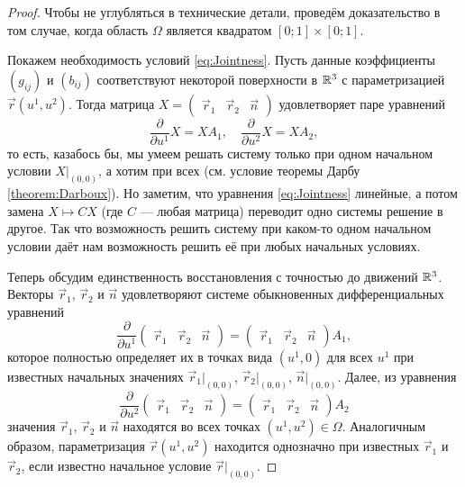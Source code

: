 \begin{proof}
	Чтобы не углубляться в технические детали, проведём доказательство в том случае, когда область $\Omega$ является квадратом $[0; 1] \times [0; 1]$.

	Покажем необходимость условий \eqref{eq:Jointness}. Пусть данные коэффициенты $(g_{ij})$ и $(b_{ij})$ соответствуют некоторой поверхности в $\mathbb{R}^3$ с параметризацией $\vec{r}(u^1, u^2)$. Тогда матрица $X =
	\begin{pmatrix}
		\vec{r}_1 & \vec{r}_2 & \vec{n}
	\end{pmatrix}$ удовлетворяет паре уравнений
	\[
		\frac{\partial}{\partial u^1}X = XA_1,\quad 
		\frac{\partial}{\partial u^2}X = XA_2,
	\]
	то есть, казабось бы, мы умеем решать систему только при одном начальном условии $X|_{(0, 0)}$, а хотим при всех (см. условие теоремы Дарбу \ref{theorem:Darboux}). Но заметим, что уравнения \eqref{eq:Jointness} линейные, а потом замена $X \mapsto CX$ (где $C$ --- любая матрица) переводит одно системы решение в другое. Так что возможность решить систему при каком-то одном начальном условии даёт нам возможность решить её при любых начальных условиях\footnotemark.
	

	Теперь обсудим единственность восстановления с точностью до движений $\mathbb{R}^3$. Векторы $\vec{r}_1$, $\vec{r}_2$ и $\vec{n}$ удовлетворяют системе обыкновенных дифференциальных уравнений
	\[
		\frac{\partial}{\partial u^1}\begin{pmatrix}
			\vec{r}_1 & \vec{r}_2 & \vec{n}
		\end{pmatrix} =
		\begin{pmatrix}
			\vec{r}_1 & \vec{r}_2 & \vec{n}
		\end{pmatrix} A_1,
	\]
	которое полностью определяет их в точках вида $(u^1, 0)$ для всех $u^1$ при известных начальных значениях $\vec{r}_1|_{(0, 0)}$, $\vec{r}_2|_{(0, 0)}$, $\vec{n}|_{(0, 0)}$. Далее, из уравнения
	\[
		\frac{\partial}{\partial u^2}\begin{pmatrix}
			\vec{r}_1 & \vec{r}_2 & \vec{n}
		\end{pmatrix} =
		\begin{pmatrix}
			\vec{r}_1 & \vec{r}_2 & \vec{n}
		\end{pmatrix} A_2
	\]
	значения $\vec{r}_1$, $\vec{r}_2$ и $\vec{n}$ находятся во всех точках $(u^1, u^2) \in \Omega$. Аналогичным образом, параметризация $\vec{r}(u^1, u^2)$ находится однозначно при известных $\vec{r}_1$ и $\vec{r}_2$, если известно начальное условие $\vec{r}|_{(0, 0)}$.


\end{proof}
